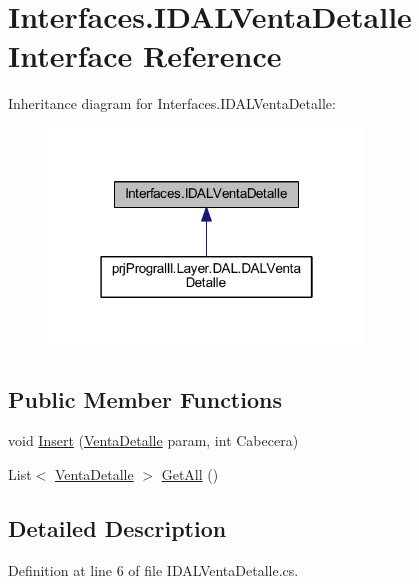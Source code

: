 \hypertarget{interface_interfaces_1_1_i_d_a_l_venta_detalle}{}\section{Interfaces.\+I\+D\+A\+L\+Venta\+Detalle Interface Reference}
\label{interface_interfaces_1_1_i_d_a_l_venta_detalle}


Inheritance diagram for Interfaces.\+I\+D\+A\+L\+Venta\+Detalle\+:
\nopagebreak
\begin{figure}[H]
\begin{center}
\leavevmode
\includegraphics[width=238pt]{interface_interfaces_1_1_i_d_a_l_venta_detalle__inherit__graph}
\end{center}
\end{figure}
\subsection*{Public Member Functions}
\begin{DoxyCompactItemize}
\item 
void \hyperlink{interface_interfaces_1_1_i_d_a_l_venta_detalle_a9d92a5b36829f84101bdcb0c5ae5eb3a}{Insert} (\hyperlink{classprj_progra_i_i_i_1_1_layer_1_1_entities_1_1_venta_detalle}{Venta\+Detalle} param, int Cabecera)
\item 
List$<$ \hyperlink{classprj_progra_i_i_i_1_1_layer_1_1_entities_1_1_venta_detalle}{Venta\+Detalle} $>$ \hyperlink{interface_interfaces_1_1_i_d_a_l_venta_detalle_a47e9941b4a7cc3e41571940ca4d930fa}{Get\+All} ()
\end{DoxyCompactItemize}


\subsection{Detailed Description}


Definition at line 6 of file I\+D\+A\+L\+Venta\+Detalle.\+cs.



